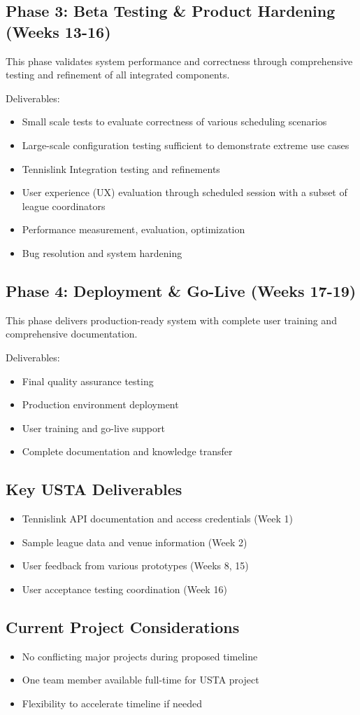 \subsection{Phase 3: Beta Testing \& Product Hardening (Weeks 13-16)}
This phase validates system performance and correctness through comprehensive testing and refinement of all integrated components.

Deliverables:
\begin{itemize}
    \item Small scale tests to evaluate correctness of various scheduling scenarios
    \item Large-scale configuration testing sufficient to demonstrate extreme use cases
    \item Tennislink Integration testing and refinements
    \item User experience (UX) evaluation through scheduled session with a subset of league coordinators
    \item Performance measurement, evaluation, optimization
    \item Bug resolution and system hardening
\end{itemize}

\subsection{Phase 4: Deployment \& Go-Live (Weeks 17-19)}
This phase delivers production-ready system with complete user training and comprehensive documentation.

Deliverables:
\begin{itemize}
    \item Final quality assurance testing
    \item Production environment deployment
    \item User training and go-live support
    \item Complete documentation and knowledge transfer
\end{itemize}

\subsection{Key USTA Deliverables}
\begin{itemize}
    \item Tennislink API documentation and access credentials (Week 1)
    \item Sample league data and venue information (Week 2)
    \item User feedback from various prototypes (Weeks 8, 15)
    \item User acceptance testing coordination (Week 16)
\end{itemize}

\subsection{Current Project Considerations}
\begin{itemize}
    \item No conflicting major projects during proposed timeline
    \item One team member available full-time for USTA project
    \item Flexibility to accelerate timeline if needed
\end{itemize}